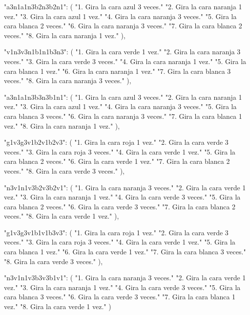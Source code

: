 {{    "a3n1a1n3b2n3b2n1": (
        "1. Gira la cara azul 3 veces.\n"
        "2. Gira la cara naranja 1 vez.\n"
        "3. Gira la cara azul 1 vez.\n"
        "4. Gira la cara naranja 3 veces.\n"
        "5. Gira la cara blanca 2 veces.\n"
        "6. Gira la cara naranja 3 veces.\n"
        "7. Gira la cara blanca 2 veces.\n"
        "8. Gira la cara naranja 1 vez."
    ),
    
    "v1n3v3n1b1n1b3n3": (
        "1. Gira la cara verde 1 vez.\n"
        "2. Gira la cara naranja 3 veces.\n"
        "3. Gira la cara verde 3 veces.\n"
        "4. Gira la cara naranja 1 vez.\n"
        "5. Gira la cara blanca 1 vez.\n"
        "6. Gira la cara naranja 1 vez.\n"
        "7. Gira la cara blanca 3 veces.\n"
        "8. Gira la cara naranja 3 veces."
    ),
    
    "a3n1a1n3b3n3b1n1": (
        "1. Gira la cara azul 3 veces.\n"
        "2. Gira la cara naranja 1 vez.\n"
        "3. Gira la cara azul 1 vez.\n"
        "4. Gira la cara naranja 3 veces.\n"
        "5. Gira la cara blanca 3 veces.\n"
        "6. Gira la cara naranja 3 veces.\n"
        "7. Gira la cara blanca 1 vez.\n"
        "8. Gira la cara naranja 1 vez."
    ),
    
    "g1v3g3v1b2v1b2v3": (
        "1. Gira la cara roja 1 vez.\n"
        "2. Gira la cara verde 3 veces.\n"
        "3. Gira la cara roja 3 veces.\n"
        "4. Gira la cara verde 1 vez.\n"
        "5. Gira la cara blanca 2 veces.\n"
        "6. Gira la cara verde 1 vez.\n"
        "7. Gira la cara blanca 2 veces.\n"
        "8. Gira la cara verde 3 veces."
    ),
    
    "n3v1n1v3b2v3b2v1": (
        "1. Gira la cara naranja 3 veces.\n"
        "2. Gira la cara verde 1 vez.\n"
        "3. Gira la cara naranja 1 vez.\n"
        "4. Gira la cara verde 3 veces.\n"
        "5. Gira la cara blanca 2 veces.\n"
        "6. Gira la cara verde 3 veces.\n"
        "7. Gira la cara blanca 2 veces.\n"
        "8. Gira la cara verde 1 vez."
    ),
    
    "g1v3g3v1b1v1b3v3": (
        "1. Gira la cara roja 1 vez.\n"
        "2. Gira la cara verde 3 veces.\n"
        "3. Gira la cara roja 3 veces.\n"
        "4. Gira la cara verde 1 vez.\n"
        "5. Gira la cara blanca 1 vez.\n"
        "6. Gira la cara verde 1 vez.\n"
        "7. Gira la cara blanca 3 veces.\n"
        "8. Gira la cara verde 3 veces."
    ),
    
    "n3v1n1v3b3v3b1v1": (
        "1. Gira la cara naranja 3 veces.\n"
        "2. Gira la cara verde 1 vez.\n"
        "3. Gira la cara naranja 1 vez.\n"
        "4. Gira la cara verde 3 veces.\n"
        "5. Gira la cara blanca 3 veces.\n"
        "6. Gira la cara verde 3 veces.\n"
        "7. Gira la cara blanca 1 vez.\n"
        "8. Gira la cara verde 1 vez."
    )

}}
